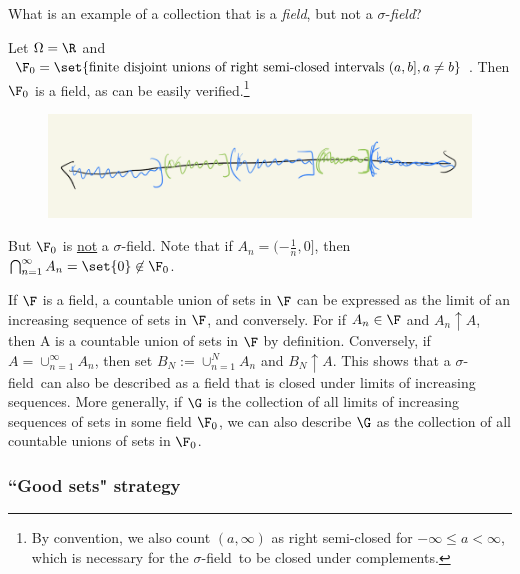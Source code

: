 \documentclass{article} %
\renewcommand{\sf}{$\sigma$-field}
\begin{document}
\begin{example} What is an example of a collection that is a \textit{field}, but not a $\sigma$-\textit{field}?  

Let $\Omega=\R$ and $\F_0 = \set{\text{finite disjoint unions of right semi-closed intervals } (a,b], a \neq b}$.  Then $\F_0$ is a field, as can be easily verified.\footnote{By convention, we also count $(a, \infty)$ as right semi-closed for $-\infty\leq a < \infty$, which is necessary for the \sf\ to be closed under complements.}   

\begin{figure}[h!]
\centering
\includegraphics[width=.6\textwidth]{images/rsc_intervals}	
\end{figure}

But $\F_0$ is \underline{not} a \sf.  Note that if $A_n = (-\frac{1}{n},0]$, then $\bigcap_{n=1}^\infty A_n = \set{0}  \not\in \F_0$.
\label{ex:field_of_finite_disjoint_unions_of_rsc_intervals}
\end{example}

\begin{remark}
 If $\F$ is a field, a countable union of sets in $\F$ can be expressed as the limit of an increasing sequence of sets in $\F$, and conversely. For if $A_n \in \F$ and $A_n \uparrow A$, then A is a countable union of sets in $\F$ by definition.  Conversely, if $A = \cup_{n=1}^\infty A_n$, then set $B_N := \cup_{n=1}^N A_n$ and $B_N \uparrow A$. This shows that a \sf\ can also be described as a field that is closed under limits of increasing sequences.  More generally, if $\G$ is the collection of all limits of increasing sequences of sets in some field $\F_0$, we can also describe $\G$ as the collection of all countable unions of sets in $\F_0$. \label{rk:the_limits_of_increasing_and_decreasing_sequences_of_sets_in_a_field_are_also_the_countable_unions}
\end{remark}


\subsubsection{``Good sets" strategy} \label{sec:good_sets_strategy}
\end{document}
